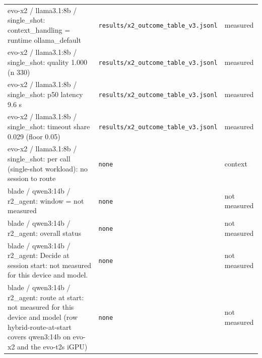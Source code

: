 \begin{longtable}{>{\raggedright\arraybackslash}p{}>{\raggedright\arraybackslash}p{}>{\raggedright\arraybackslash}p{}}
\small evo-x2 / llama3.1:8b / single\_shot: context\_handling = runtime ollama\_default & {\footnotesize \texttt{results/\allowbreak{}x2\_\allowbreak{}outcome\_\allowbreak{}table\_\allowbreak{}v3.\allowbreak{}jsonl}} & \small measured \\

\small evo-x2 / llama3.1:8b / single\_shot: quality 1.000 (n 330) & {\footnotesize \texttt{results/\allowbreak{}x2\_\allowbreak{}outcome\_\allowbreak{}table\_\allowbreak{}v3.\allowbreak{}jsonl}} & \small measured \\

\small evo-x2 / llama3.1:8b / single\_shot: p50 latency 9.6 s & {\footnotesize \texttt{results/\allowbreak{}x2\_\allowbreak{}outcome\_\allowbreak{}table\_\allowbreak{}v3.\allowbreak{}jsonl}} & \small measured \\

\small evo-x2 / llama3.1:8b / single\_shot: timeout share 0.029 (floor 0.05) & {\footnotesize \texttt{results/\allowbreak{}x2\_\allowbreak{}outcome\_\allowbreak{}table\_\allowbreak{}v3.\allowbreak{}jsonl}} & \small measured \\

\small evo-x2 / llama3.1:8b / single\_shot: per call (single-shot workload): no session to route & {\footnotesize \texttt{none}} & \small context \\

\small blade / qwen3:14b / r2\_agent: window = not measured & {\footnotesize \texttt{none}} & \small not measured \\

\small blade / qwen3:14b / r2\_agent: overall status & {\footnotesize \texttt{none}} & \small not measured \\

\small blade / qwen3:14b / r2\_agent: Decide at session start: not measured for this device and model. & {\footnotesize \texttt{none}} & \small not measured \\

\small blade / qwen3:14b / r2\_agent: route at start: not measured for this device and model (row hybrid-route-at-start covers qwen3:14b on evo-x2 and the evo-t2s iGPU) & {\footnotesize \texttt{none}} & \small not measured \\

\bottomrule
\end{longtable}
